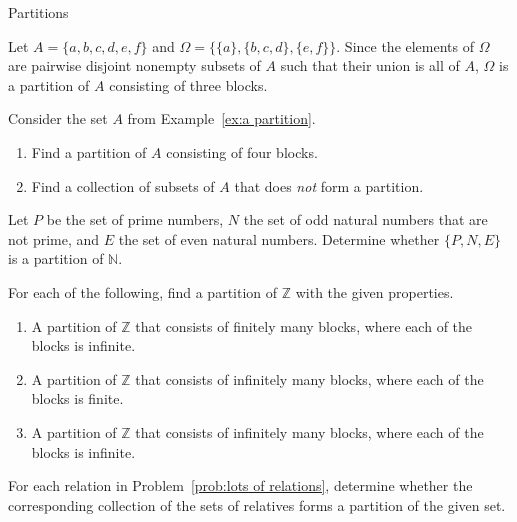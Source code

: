 \begin{section}{Partitions}
\begin{example}\label{ex:a partition}
Let $A=\{a,b,c,d,e,f\}$ and $\Omega=\{\{a\}, \{b,c,d\}, \{e,f\}\}$. Since the elements of $\Omega$ are pairwise disjoint nonempty subsets of $A$ such that their union is all of $A$, $\Omega$ is a partition of $A$ consisting of three blocks.
\end{example}

\begin{problem}
Consider the set $A$ from Example~\ref{ex:a partition}.
\begin{enumerate}[label=\textrm{(\alph*)}]
\item Find a partition of $A$ consisting of four blocks.
\item Find a collection of subsets of $A$ that does \emph{not} form a partition.
\end{enumerate}
\end{problem}

\begin{problem}
Let $P$ be the set of prime numbers, $N$ the set of odd natural numbers that are not prime, and $E$ the set of even natural numbers.  Determine whether $\{P, N, E\}$ is a partition of $\mathbb{N}$.
\end{problem}


\begin{problem}
For each of the following, find a partition of $\mathbb{Z}$ with the given properties.
\begin{enumerate}[label=\textrm{(\alph*)}]
\item A partition of $\mathbb{Z}$ that consists of finitely many blocks, where each of the blocks is infinite.
\item A partition of $\mathbb{Z}$ that consists of infinitely many blocks, where each of the blocks is finite.
\item A partition of $\mathbb{Z}$ that consists of infinitely many blocks, where each of the blocks is infinite.
\end{enumerate}
\end{problem}

\begin{problem}
For each relation in Problem~\ref{prob:lots of relations}, determine whether the corresponding collection of the sets of relatives forms a partition of the given set.
\end{problem}


\end{section}
